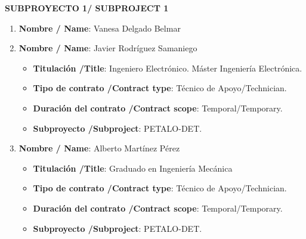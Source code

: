\noindent\textbf{SUBPROYECTO 1/ SUBPROJECT 1}
\begin{enumerate}
\item {\bf Nombre / Name}: Vanesa Delgado Belmar
\item {\bf Nombre / Name}: Javier Rodríguez Samaniego
\begin{itemize}
\item {\bf Titulación /Title}: Ingeniero Electrónico. Máster Ingeniería Electrónica.
\item {\bf Tipo de contrato /Contract type}: Técnico de Apoyo/Technician.
\item {\bf Duración del contrato /Contract scope}: Temporal/Temporary.
\item {\bf Subproyecto /Subproject}: PETALO-DET.
\end{itemize}
\item {\bf Nombre / Name}: Alberto Martínez Pérez
\begin{itemize}
\item {\bf Titulación /Title}: Graduado en Ingeniería Mecánica
\item {\bf Tipo de contrato /Contract type}: Técnico de Apoyo/Technician.
\item {\bf Duración del contrato /Contract scope}: Temporal/Temporary.
\item {\bf Subproyecto /Subproject}: PETALO-DET.
\end{itemize}

\end{enumerate}

